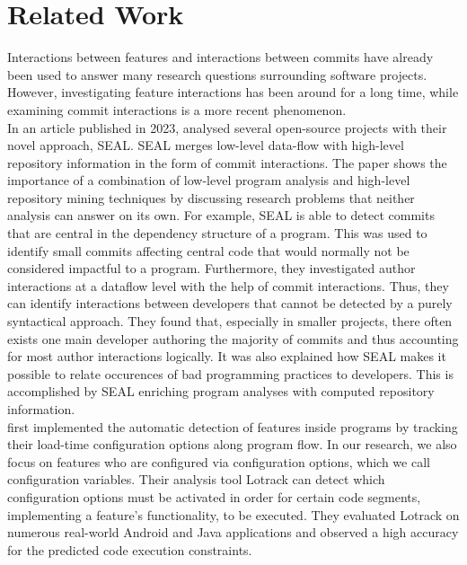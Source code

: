 \chapter{Related Work}\label{ch:related_work}

Interactions between features \cite{lillack2014tracking,kolesnikov2017relation} and interactions between commits \cite{sattler2023seal} have already been used to answer many research questions surrounding software projects.
However, investigating feature interactions has been around for a long time, while examining commit interactions is a more recent phenomenon. \\
In an article published in 2023, \citet{sattler2023seal} analysed several open-source projects with their novel approach, SEAL.
SEAL merges low-level data-flow with high-level repository information in the form of commit interactions.
The paper shows the importance of a combination of low-level program analysis and high-level repository mining techniques by discussing research problems that neither analysis can answer on its own.
For example, SEAL is able to detect commits that are central in the dependency structure of a program\cite{sattler2023seal}.
This was used to identify small commits affecting central code that would normally not be considered impactful to a program.
Furthermore, they investigated author interactions at a dataflow level with the help of commit interactions.
Thus, they can identify interactions between developers that cannot be detected by a purely syntactical approach.
They found that, especially in smaller projects, there often exists one main developer authoring the majority of commits\cite{sattler2023seal} and thus accounting for most author interactions logically. 
It was also explained how SEAL makes it possible to relate occurences of bad programming practices to developers. 
This is accomplished by SEAL enriching program analyses with computed repository information. \\
\citet{lillack2014tracking} first implemented the automatic detection of features inside programs by tracking their load-time configuration options along program flow.
In our research, we also focus on features who are configured via configuration options, which we call configuration variables. 
Their analysis tool Lotrack can detect which configuration options must be activated in order for certain code segments, implementing a feature's functionality, to be executed.
They evaluated Lotrack on numerous real-world Android and Java applications and observed a high accuracy for the predicted code execution constraints\cite{lillack2014tracking}. \\
